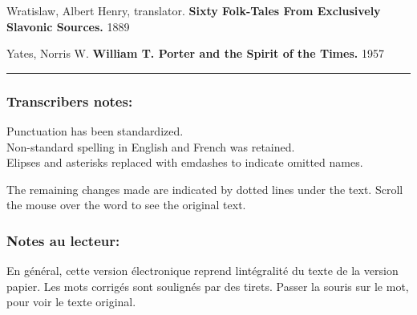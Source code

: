 \documentclass[14pt,a4paper]{memoir}
\begin{document}
Wratislaw, Albert Henry, translator. \textbf{Sixty Folk-Tales From
Exclusively Slavonic Sources.} 1889

Yates, Norris W. \textbf{William T. Porter and the Spirit of the Times.}
1957

\begin{center}\rule{0.5\linewidth}{0.5pt}\end{center}

\protect\hypertarget{4533318093929944247_33931-h-3.htm.xhtml}{}{}

\hypertarget{4533318093929944247_33931-h-3.htm.xhtmlux5cux23pgepubid00035}{}
\subsubsection{Transcriber\textquotesingle s notes:}

Punctuation has been standardized.\\
Non-standard spelling in English and French was retained.\\
Elipses and asterisks replaced with emdashes to indicate omitted names.

The remaining changes made are indicated by dotted lines under the text.
Scroll the mouse over the word to see the original text.

\hypertarget{4533318093929944247_33931-h-3.htm.xhtmlux5cux23pgepubid00036}{%
\subsubsection{Notes au
lecteur:}\label{4533318093929944247_33931-h-3.htm.xhtmlux5cux23pgepubid00036}}

En général, cette version électronique reprend
l\textquotesingle intégralité du texte de la version papier. Les mots
corrigés sont soulignés par des tirets. Passer la souris sur le mot,
pour voir le texte original.

\begin{verbatim}
\end{verbatim}

\protect\hypertarget{4533318093929944247_33931-h-4.htm.xhtml}{}{}

\hypertarget{4533318093929944247_33931-h-4.htm.xhtmlux5cux23pg-end-separator}{}
\end{document}
